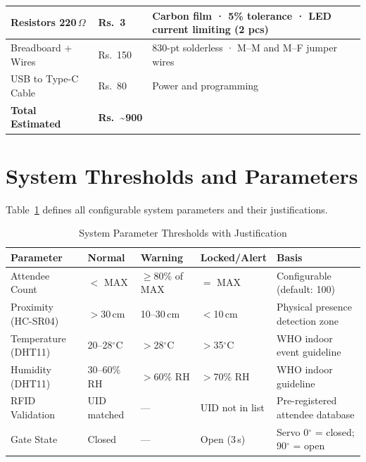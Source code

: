\documentclass[12pt,a4paper]{report}
\begin{document}
\begin{table}[h!]
\begin{tabular}{|p{3.5cm}|p{1.2cm}|p{8.5cm}|}
Resistors 220\,$\Omega$ & Rs.~3 & Carbon film · 5\% tolerance · LED current limiting (2 pcs) \\
\hline

Breadboard + Wires & Rs.~150 & 830-pt solderless · M--M and M--F jumper wires \\
\hline

USB to Type-C Cable & Rs.~80 & Power and programming \\
\hline

\textbf{Total Estimated} & \textbf{Rs.~\textasciitilde900} & \\
\hline

\end{tabular}
\end{table}

\section{System Thresholds and Parameters}

Table~\ref{tab:thresholds} defines all configurable system parameters and their justifications.

\begin{table}[h!]
\centering
\caption{System Parameter Thresholds with Justification}
\label{tab:thresholds}
\renewcommand{\arraystretch}{1.3}

\begin{tabular}{|p{3cm}|p{2.2cm}|p{2.2cm}|p{2.2cm}|p{3.5cm}|}
\hline
\textbf{Parameter} & \textbf{Normal} & \textbf{Warning} & \textbf{Locked/Alert} & \textbf{Basis} \\
\hline

Attendee Count & $<$ MAX & $\geq$80\% of MAX & $=$ MAX & Configurable (default: 100) \\
\hline

Proximity (HC-SR04) & $>$30\,cm & 10--30\,cm & $<$10\,cm & Physical presence detection zone \\
\hline

Temperature (DHT11) & 20--28$^\circ$C & $>$28$^\circ$C & $>$35$^\circ$C & WHO indoor event guideline  \\
\hline

Humidity (DHT11) & 30--60\% RH & $>$60\% RH & $>$70\% RH & WHO indoor guideline  \\
\hline

RFID Validation & UID matched & --- & UID not in list & Pre-registered attendee database \\
\hline

Gate State & Closed & --- & Open (3\,s) & Servo 0$^\circ$ = closed; 90$^\circ$ = open \\
\hline

\end{tabular}
\end{table}
\end{document}
